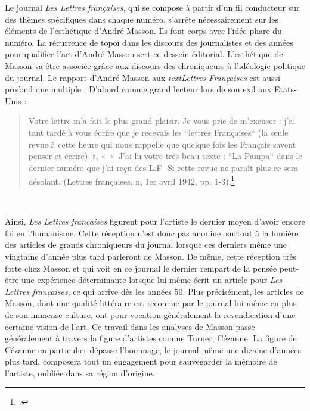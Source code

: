 

Le journal \emph{Les Lettres françaises}, qui se compose à partir d’un fil conducteur sur des thèmes spécifiques dans chaque numéro, s’arrête nécessairement sur les éléments de l’esthétique d’André Masson.  Ils font corps avec l’idée-phare du numéro.  La récurrence de topoï dans les discours des journalistes et des années pour qualifier l’art d’André Masson sert ce dessein éditorial. L’esthétique de Masson va être associée grâce aux discours des chroniqueurs à l’idéologie politique du journal. Le rapport d’André Masson aux \emph{textLettres Françaises} est aussi profond que multiple : D’abord comme grand lecteur lors de son exil aux Etats-Unis : 

\begin{quote}
Votre lettre m’a fait le plus grand plaisir. Je vous prie de m’excuser : j’ai tant tardé à vous écrire que je recevais les “lettres Françaises“ (la seule revue à cette heure qui nous rappelle que quelque fois les Français savent penser et écrire) », « « J’ai lu votre très beau texte : “La Pampa“ dans le dernier numéro que j’ai reçu des L.F- Si cette revue ne paraît plus ce sera désolant. (Lettres françaises, n, 1er avril 1942, pp. 1-3).\footcite[p478]{anneessurrealistes}
\end{quote}
 

	Ainsi, \emph{Les Lettres françaises }figurent pour l’artiste le dernier moyen d’avoir encore foi en l’humanisme. Cette réception n’est donc pas anodine, surtout à la lumière des articles de grands chroniqueurs du journal lorsque ces derniers même une vingtaine d’année plus tard parleront de Masson. De même, cette réception très forte chez Masson et qui voit en ce journal le dernier rempart de la pensée peut-être une expérience déterminante lorsque lui-même écrit un article pour \emph{Les Lettres françaises}, ce qui arrive dès les années 50. Plus précisément, les articles de Masson, dont une qualité littéraire est reconnue par le journal lui-même en plus de son immense culture, ont pour vocation généralement la revendication d’une certaine vision de l’art. Ce travail dans les analyses de Masson passe généralement à travers la figure d’artistes comme Turner, Cézanne. La figure de Cézanne en particulier dépasse l’hommage, le journal même une dizaine d’années plus tard, composera tout un engagement pour sauvegarder la mémoire de l’artiste, oubliée dans sa région d’origine. 

